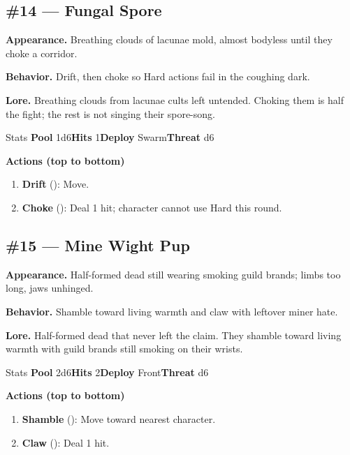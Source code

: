 \subsection*{\#14 --- Fungal Spore}

\textbf{Appearance.} Breathing clouds of lacunae mold, almost bodyless until they choke a corridor.

\textbf{Behavior.} Drift, then choke so Hard actions fail in the coughing dark.

\textbf{Lore.} Breathing clouds from lacunae cults left untended. Choking them is half the fight; the rest is not singing their spore-song.

\begin{monsterentry}{Stats}
\textbf{Pool} 1d6\quad\textbf{Hits} 1\quad\textbf{Deploy} Swarm\quad\textbf{Threat} d6

\textbf{Actions (top to bottom)}
\begin{enumerate}\setlength{\itemsep}{0.15em}\setlength{\parskip}{0pt}
  \item \textbf{Drift} (\easy): Move.
  \item \textbf{Choke} (\medium): Deal 1 hit; character cannot use Hard this round.
\end{enumerate}
\end{monsterentry}

\subsection*{\#15 --- Mine Wight Pup}

\textbf{Appearance.} Half-formed dead still wearing smoking guild brands; limbs too long, jaws unhinged.

\textbf{Behavior.} Shamble toward living warmth and claw with leftover miner hate.

\textbf{Lore.} Half-formed dead that never left the claim. They shamble toward living warmth with guild brands still smoking on their wrists.

\begin{monsterentry}{Stats}
\textbf{Pool} 2d6\quad\textbf{Hits} 2\quad\textbf{Deploy} Front\quad\textbf{Threat} d6

\textbf{Actions (top to bottom)}
\begin{enumerate}\setlength{\itemsep}{0.15em}\setlength{\parskip}{0pt}
  \item \textbf{Shamble} (\easy): Move toward nearest character.
  \item \textbf{Claw} (\medium): Deal 1 hit.
\end{enumerate}
\end{monsterentry}

